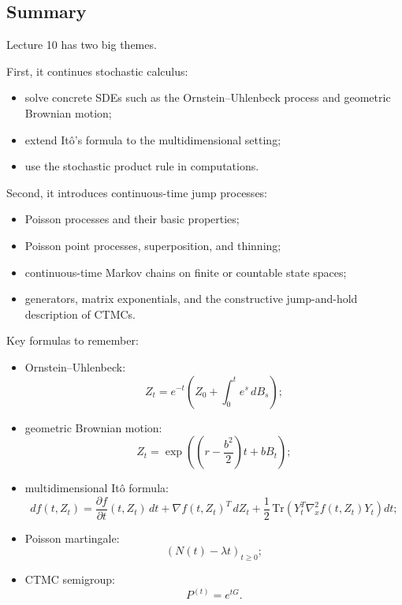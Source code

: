\documentclass[11pt]{article}
\theoremstyle{definition}
\begin{document}
\subsection{Summary}

\begin{summarybox}
Lecture 10 has two big themes.

First, it continues stochastic calculus:
\begin{itemize}[leftmargin=2em]
    \item solve concrete SDEs such as the Ornstein--Uhlenbeck process and geometric Brownian motion;
    \item extend It\^o's formula to the multidimensional setting;
    \item use the stochastic product rule in computations.
\end{itemize}

Second, it introduces continuous-time jump processes:
\begin{itemize}[leftmargin=2em]
    \item Poisson processes and their basic properties;
    \item Poisson point processes, superposition, and thinning;
    \item continuous-time Markov chains on finite or countable state spaces;
    \item generators, matrix exponentials, and the constructive jump-and-hold description of CTMCs.
\end{itemize}

Key formulas to remember:
\begin{itemize}[leftmargin=2em]
    \item Ornstein--Uhlenbeck:
    \[
    Z_t=e^{-t}\left(Z_0+\int_0^t e^s\,dB_s\right);
    \]
    \item geometric Brownian motion:
    \[
    Z_t=\exp\!\left(\left(r-\frac{b^2}{2}\right)t+bB_t\right);
    \]
    \item multidimensional It\^o formula:
    \[
    df(t,Z_t)
    =
    \frac{\partial f}{\partial t}(t,Z_t)\,dt
    +
    \nabla f(t,Z_t)^T\,dZ_t
    +
    \frac12\,\mathrm{Tr}\!\left(Y_t^T\nabla_x^2 f(t,Z_t)Y_t\right)dt;
    \]
    \item Poisson martingale:
    \[
    (N(t)-\lambda t)_{t\ge 0};
    \]
    \item CTMC semigroup:
    \[
    P^{(t)}=e^{tG}.
    \]
\end{itemize}
\end{summarybox}
\end{document}
